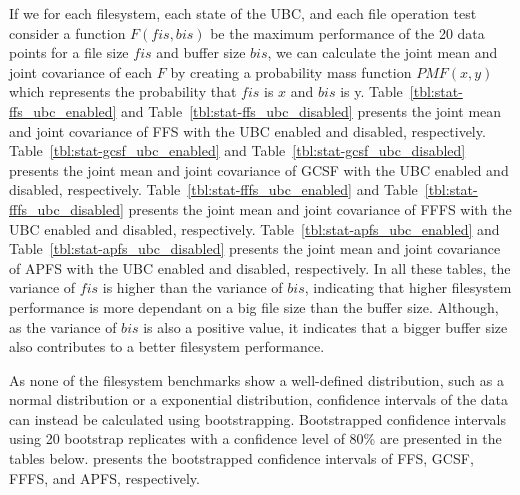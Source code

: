 If we for each filesystem, each state of the \gls{UBC}, and each file operation test consider a function $F(fis, bis)$ be the maximum performance of the 20 data points for a file size $fis$ and buffer size $bis$, we can calculate the joint mean and joint covariance of each $F$ by creating a probability mass function $PMF(x, y)$ which represents the probability that $fis$ is $x$ and $bis$ is y. Table~\ref{tbl:stat-ffs_ubc_enabled} and Table~\ref{tbl:stat-ffs_ubc_disabled} presents the joint mean and joint covariance of \gls{FFS} with the \gls{UBC} enabled and disabled, respectively. Table~\ref{tbl:stat-gcsf_ubc_enabled} and Table~\ref{tbl:stat-gcsf_ubc_disabled} presents the joint mean and joint covariance of \gls{GCSF} with the \gls{UBC} enabled and disabled, respectively. Table~\ref{tbl:stat-fffs_ubc_enabled} and Table~\ref{tbl:stat-fffs_ubc_disabled} presents the joint mean and joint covariance of \gls{FFFS} with the \gls{UBC} enabled and disabled, respectively. Table~\ref{tbl:stat-apfs_ubc_enabled} and Table~\ref{tbl:stat-apfs_ubc_disabled} presents the joint mean and joint covariance of \gls{APFS} with the \gls{UBC} enabled and disabled, respectively. In all these tables, the variance of $fis$ is higher than the variance of $bis$, indicating that higher filesystem performance is more dependant on a big file size than the buffer size. Although, as the variance of $bis$ is also a positive value, it indicates that a bigger buffer size also contributes to a better filesystem performance.


\FloatBarrier

\FloatBarrier



\FloatBarrier

\FloatBarrier



\FloatBarrier

\FloatBarrier



\FloatBarrier

\FloatBarrier

As none of the filesystem benchmarks show a well-defined distribution, such as a normal distribution or a exponential distribution, confidence intervals of the data can instead be calculated using bootstrapping. Bootstrapped confidence intervals using 20 bootstrap replicates with a confidence level of 80\% are presented in the tables below.  presents the bootstrapped confidence intervals of \gls{FFS}, \gls{GCSF}, \gls{FFFS}, and \gls{APFS}, respectively.
\FloatBarrier





